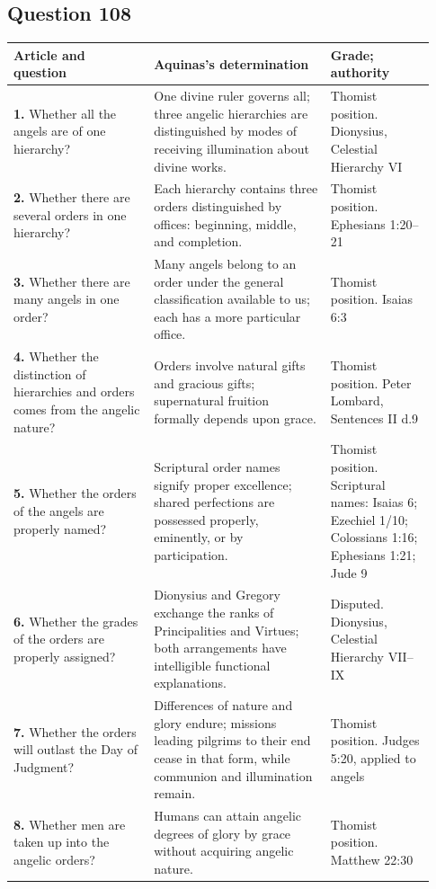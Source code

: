 \subsection{Question 108}
\begin{longtable}{@{}>{\raggedright\arraybackslash}p{0.31\linewidth}>{\raggedright\arraybackslash}p{0.39\linewidth}>{\raggedright\arraybackslash}p{0.23\linewidth}@{}}
\toprule
Article and question & Aquinas's determination & Grade; authority\\
\midrule\endhead
\textbf{1.} Whether all the angels are of one hierarchy? & One divine ruler governs all; three angelic hierarchies are distinguished by modes of receiving illumination about divine works. & Thomist position. Dionysius, Celestial Hierarchy VI\\
\textbf{2.} Whether there are several orders in one hierarchy? & Each hierarchy contains three orders distinguished by offices: beginning, middle, and completion. & Thomist position. Ephesians 1:20--21\\
\textbf{3.} Whether there are many angels in one order? & Many angels belong to an order under the general classification available to us; each has a more particular office. & Thomist position. Isaias 6:3\\
\textbf{4.} Whether the distinction of hierarchies and orders comes from the angelic nature? & Orders involve natural gifts and gracious gifts; supernatural fruition formally depends upon grace. & Thomist position. Peter Lombard, Sentences II d.9\\
\textbf{5.} Whether the orders of the angels are properly named? & Scriptural order names signify proper excellence; shared perfections are possessed properly, eminently, or by participation. & Thomist position. Scriptural names: Isaias 6; Ezechiel 1/10; Colossians 1:16; Ephesians 1:21; Jude 9\\
\textbf{6.} Whether the grades of the orders are properly assigned? & Dionysius and Gregory exchange the ranks of Principalities and Virtues; both arrangements have intelligible functional explanations. & Disputed. Dionysius, Celestial Hierarchy VII--IX\\
\textbf{7.} Whether the orders will outlast the Day of Judgment? & Differences of nature and glory endure; missions leading pilgrims to their end cease in that form, while communion and illumination remain. & Thomist position. Judges 5:20, applied to angels\\
\textbf{8.} Whether men are taken up into the angelic orders? & Humans can attain angelic degrees of glory by grace without acquiring angelic nature. & Thomist position. Matthew 22:30\\
\bottomrule
\end{longtable}
